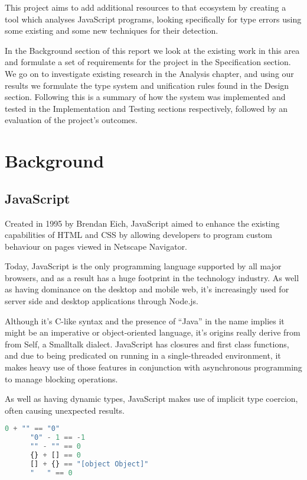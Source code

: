 \documentclass[british, twoside, openright]{bhamthesis}
\theoremstyle{definition}
\begin{document}
  This project aims to add additional resources to that ecosystem by creating a tool which analyses JavaScript programs, looking specifically for type errors using some existing and some new techniques for their detection.

  In the Background section of this report we look at the existing work in this area and formulate a set of requirements for the project in the Specification section. We go on to investigate existing research in the Analysis chapter, and using our results we formulate the type system and unification rules found in the Design section. Following this is a summary of how the system was implemented and tested in the Implementation and Testing sections respectively, followed by an evaluation of the project's outcomes.

\chapter{Background}

  \section{JavaScript}
    Created in 1995 by Brendan Eich, JavaScript aimed to enhance the existing capabilities of HTML and CSS by allowing developers to program custom behaviour on pages viewed in Netscape Navigator.

    Today, JavaScript is the only programming language supported by all major browsers, and as a result has a huge footprint in the technology industry. As well as having dominance on the desktop and mobile web, it's increasingly used for server side and desktop applications through Node.js.

    Although it’s C-like syntax and the presence of “Java” in the name implies it might be an imperative or object-oriented language, it’s origins really derive from from Self, a Smalltalk dialect. JavaScript has closures and first class functions, and due to being predicated on running in a single-threaded environment, it makes heavy use of those features in conjunction with asynchronous programming to manage blocking operations.

    As well as having dynamic types, JavaScript makes use of implicit type coercion, often causing unexpected results.

    \begin{lstlisting}[language=JavaScript]
      0 + "" == "0"
      "0" - 1 == -1
      "" - "" == 0
      {} + [] == 0
      [] + {} == "[object Object]"
      "   " == 0
    \end{lstlisting}
\end{document}
